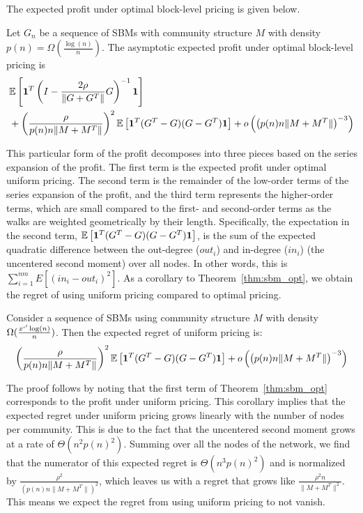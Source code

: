 The expected profit under optimal block-level pricing is given below.

\begin{theorem}\label{thm:sbm_opt}
    Let $G_n$ be a sequence of SBMs with community structure $M$ with density $p(n) = \Omega\left(\frac{\log (n)}{n}\right)$. 
    The asymptotic expected profit under optimal block-level pricing is
    \begin{align*}
        &\mathbb{E}\left[\mathbf{1}^T \left(I - \frac{2\rho}{\|G+G^T\|}  G\right)^{-1} \mathbf{1}\right]\\
        &+ \left(\frac{\rho}{p(n) n \|M+M^T\|} \right)^2 \mathbb{E}\left[  \mathbf{1}^T (G^T-G)(G-G^T)\mathbf{1}\right] + o\left( \left( p(n) n \|M+M^T\| \right)^{-3} \right)
   \end{align*}
\end{theorem}
This particular form of the profit decomposes into three pieces based on the series expansion of the profit. The first term is the expected profit under optimal uniform pricing. The second term is the remainder of the low-order terms of the series expansion of the profit, and the third term represents the higher-order terms, which are small compared to the first- and second-order terms as the walks are weighted geometrically by their length. Specifically, the expectation in the second term, $\mathbb{E}\left[\mathbf{1}^T (G^T - G)(G-G^T) \mathbf{1}\right]$, is the sum of the expected quadratic difference between the out-degree ($out_i$) and in-degree ($in_i$) (the uncentered second moment) over all nodes. In other words, this is $\sum_{i=1}^{nm} E[ {(in_i - out_i)}^2]$.   As a corollary to Theorem~\ref{thm:sbm_opt}, we obtain the regret of using uniform pricing compared to optimal pricing.

\begin{corollary}\label{cor:uni_sbm_reg}
    Consider a sequence of SBMs using community structure $M$ with density $\Omega(\frac{x`'\log(n)}{n})$. Then the expected regret of uniform pricing is:
    \begin{equation}
        \left(\frac{\rho}{p(n) n \|M+M^T\|} \right)^2 \mathbb{E}\left[  \mathbf{1}^T (G^T-G)(G-G^T)\mathbf{1}\right] + o\left( \left(p(n) n \|M+M^T\| \right)^{-3} \right)
    \end{equation}
\end{corollary}

The proof follows by noting that the first term of Theorem~\ref{thm:sbm_opt} corresponds to the profit under uniform pricing. This corollary implies that the expected regret under uniform pricing grows linearly with the number of nodes per community. This is due to the fact that the uncentered second moment grows at a rate of $\Theta(n^2 p(n)^2)$. Summing over all the nodes of the network, we find that the numerator of this expected regret is $\Theta(n^3 p(n)^2)$ and is normalized by $\frac{\rho^2}{ (p(n) n \|M+M^T\|)^2 }$, which leaves us with a regret that grows like $\frac{\rho^2 n }{\|M+M^T\|^2}$. This means we expect the regret from using uniform pricing to not vanish. 

